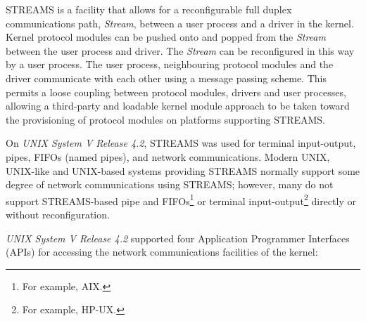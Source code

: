 \documentclass[letterpaper,final,notitlepage,twocolumn,10pt,twoside]{article}
\begin{document}
STREAMS is a facility that allows for a reconfigurable full duplex communications path,
\textit{Stream}, between a user process and a driver in the kernel.   Kernel protocol modules can be
pushed onto and popped from the \textit{Stream} between the user process and driver.  The
\textit{Stream} can be reconfigured in this way by a user process.  The user process, neighbouring
protocol modules and the driver communicate with each other using a message passing scheme.  This
permits a loose coupling between protocol modules, drivers and user processes, allowing a
third-party and loadable kernel module approach to be taken toward the provisioning of protocol
modules on platforms supporting STREAMS.

On \textsl{UNIX System V Release 4.2}, STREAMS was used for terminal input-output, pipes, FIFOs
(named pipes), and network communications.  Modern UNIX, UNIX-like and UNIX-based systems providing
STREAMS normally support some degree of network communications using STREAMS; however, many do not
support STREAMS-based pipe and FIFOs\footnote{For example, AIX.} or terminal
input-output\footnote{For example, HP-UX.} directly or without reconfiguration.

\textsl{UNIX System V Release 4.2} supported four Application Programmer Interfaces (APIs) for
accessing the network communications facilities of the kernel:
\end{document}
